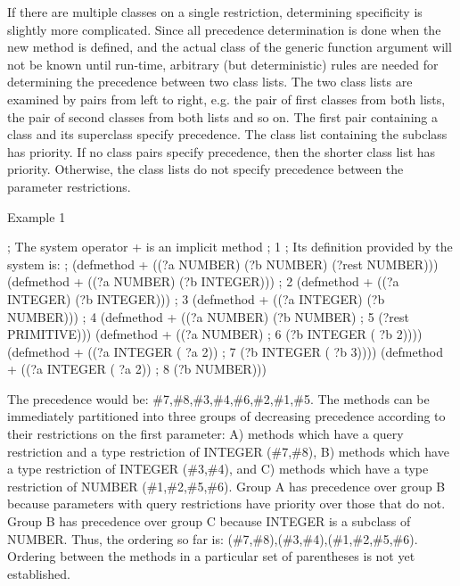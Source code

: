 \documentclass[letterpaper,10pt,english]{sphinxmanual}
\begin{document}
If there are multiple classes on a single restriction, determining
specificity is slightly more complicated. Since all precedence
determination is done when the new method is defined, and the actual
class of the generic function argument will not be known until run-time,
arbitrary (but deterministic) rules are needed for determining the
precedence between two class lists. The two class lists are examined by
pairs from left to right, e.g. the pair of first classes from both
lists, the pair of second classes from both lists and so on. The first
pair containing a class and its superclass specify precedence. The class
list containing the subclass has priority. If no class pairs specify
precedence, then the shorter class list has priority. Otherwise, the
class lists do not specify precedence between the parameter
restrictions.

Example 1

\begin{sphinxVerbatim}[commandchars=\\\{\}]
; The system operator \PYGZsq{}+\PYGZsq{} is an implicit method ; \PYGZsh{}1
; Its definition provided by the system is:
; (defmethod + ((?a NUMBER) (?b NUMBER) (\PYGZdl{}?rest NUMBER)))
(defmethod + ((?a NUMBER) (?b INTEGER))) ; \PYGZsh{}2
(defmethod + ((?a INTEGER) (?b INTEGER))) ; \PYGZsh{}3
(defmethod + ((?a INTEGER) (?b NUMBER))) ; \PYGZsh{}4
(defmethod + ((?a NUMBER) (?b NUMBER) ; \PYGZsh{}5
(\PYGZdl{}?rest PRIMITIVE)))
(defmethod + ((?a NUMBER) ; \PYGZsh{}6
(?b INTEGER (\PYGZgt{} ?b 2))))
(defmethod + ((?a INTEGER (\PYGZgt{} ?a 2)) ; \PYGZsh{}7
(?b INTEGER (\PYGZgt{} ?b 3))))
(defmethod + ((?a INTEGER (\PYGZgt{} ?a 2)) ; \PYGZsh{}8
(?b NUMBER)))
\end{sphinxVerbatim}

The precedence would be: \#7,\#8,\#3,\#4,\#6,\#2,\#1,\#5. The methods can be
immediately partitioned into three groups of decreasing precedence
according to their restrictions on the first parameter: A) methods which
have a query restriction and a type restriction of INTEGER (\#7,\#8), B)
methods which have a type restriction of INTEGER (\#3,\#4), and C) methods
which have a type restriction of NUMBER (\#1,\#2,\#5,\#6). Group A has
precedence over group B because parameters with query restrictions have
priority over those that do not. Group B has precedence over group C
because INTEGER is a subclass of NUMBER. Thus, the ordering so far is:
(\#7,\#8),(\#3,\#4),(\#1,\#2,\#5,\#6). Ordering between the methods in a
particular set of parentheses is not yet established.
\end{document}
